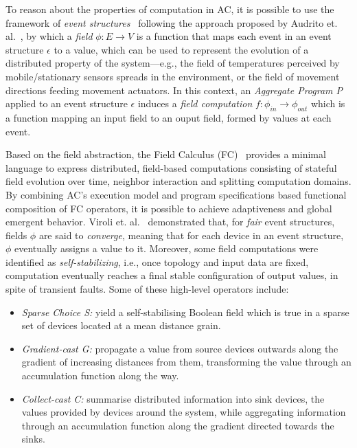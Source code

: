 \documentclass[12pt]{article}
\begin{document}
To reason about the properties of computation in AC, it is possible to use the framework of \textit{event structures}~\cite{nielsen1981petri} following the approach proposed by Audrito et. al.~\cite{audrito2018space},  by which a
\textit{field} $\phi:E \rightarrow V$ is a function that maps each event in an event structure $\epsilon$ to a value, 
which can be used to represent the evolution of a distributed property of the system—e.g.,
the field of temperatures perceived by mobile/stationary sensors spreads in the environment,
or the field of movement directions feeding movement actuators.
In this context, an \textit{Aggregate Program P} applied to an event structure $\epsilon$ induces a \textit{field computation} $f:\phi_{in}\rightarrow\phi_{out}$ which is a function mapping an input field to an ouput field, formed by values at each event.

Based on the field abstraction, the Field Calculus (FC)~\cite{viroli2013calculus} provides a minimal language to express distributed, field-based computations consisting of stateful field evolution over time, neighbor interaction and splitting computation domains.
By combining AC's execution model and program specifications based functional composition of FC operators, it is possible to achieve
adaptiveness and global emergent behavior. 
Viroli et. al.~\cite{viroli2018engineering} demonstrated that, for \textit{fair} event structures, fields $\phi$ are said to \textit{converge}, meaning that for each device in an event structure, $\phi$ eventually assigns a value to it. 
Moreover, some field computations were identified as \textit{self-stabilizing}, i.e., once topology and input data are fixed, computation eventually reaches a final
stable configuration of output values, in spite of transient faults. Some of these high-level operators include:

\begin{itemize}
	\item \textit{Sparse Choice S:} yield a self-stabilising Boolean field which is true in a sparse set of devices located at a mean distance grain.
	\item \textit{Gradient-cast G:} propagate a value from source devices outwards along the gradient of increasing distances from them, transforming the value through an
accumulation function along the way.
	\item \textit{Collect-cast C:} summarise distributed information into sink devices, the values provided by devices around the system, while aggregating information through an accumulation function along
the gradient directed towards the sinks.
\end{itemize}
\end{document}
